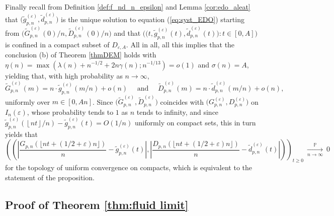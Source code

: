 \documentclass[a4, 11pt]{article}
\numberwithin{equation}{section}
\theoremstyle{plain}
\theoremstyle{definition}
\theoremstyle{remark}
\begin{document}
Finally recall from Definition \ref{def:f_nd_n_epsilon} and Lemma \ref{cor:edo_aleat} that $\big(\tilde{g}_{p,n}^{(\varepsilon)},\tilde{d}_{p,n}^{(\varepsilon)}\big)$ is the unique solution to equation (\ref{eq:syst_EDO}) starting from $\big(\tilde{G}^{(\varepsilon)}_{p,n}(0)/n,\tilde{D}^{(\varepsilon)}_{p,n}(0)/n\big)$ and that $\big(\big(t,\tilde{g}_{p,n}^{(\varepsilon)}(t),\tilde{d}_{p,n}^{(\varepsilon)}(t)\big):t\in \left[0,A\right]\big)$ is confined in a compact subset of $D_{\varepsilon,A}$. All in all, all this implies that the conclusion (b) of Theorem \ref{thmDEM} holds with $\eta(n)=\max(\lambda(n)+n^{-1/2}+2n\gamma(n);n^{-1/13})=o(1)$ and $\sigma(n)=A$, yielding that, with high probability as $n\to \infty$,
\begin{equation*}
	\tilde{G}^{(\varepsilon)}_{p,n}(m)=n\cdot \tilde{g}_{p,n}^{(\varepsilon)}(m/n)+o(n) \quad\text{ and }\quad  \tilde{D}^{(\varepsilon)}_{p,n}(m)=n\cdot \tilde{d}_{p,n}^{(\varepsilon)}(m/n)+o(n),
\end{equation*}
uniformly over $m\in [0,An]$. Since $\big(\tilde{G}^{(\varepsilon)}_{p,n},\tilde{D}^{(\varepsilon)}_{p,n}\big)$ coincides with $\big(G_{p,n}^{(\varepsilon)},D_{p,n}^{(\varepsilon)}\big)$ on $I_n(\varepsilon)$, whose probability tends to $1$ as $n$ tends to infinity, and since $\tilde{g}_{p,n}^{(\varepsilon)}\left(\left\lfloor nt\right\rfloor/n\right)-\tilde{g}_{p,n}^{(\varepsilon)}(t)=O\left(1/n\right)$ uniformly on compact sets, this in turn yields that
\begin{equation*}
		\left(\left(\left\lvert \frac{G_{p,n}\left(\lfloor nt+(1/2+\varepsilon) n\rfloor\right)}{n}-\tilde{g}_{p,n}^{(\varepsilon)}(t) \right\vert, \left\lvert \frac{D_{p,n}\left(\lfloor nt+(1/2+\varepsilon) n\rfloor\right)}{n}-\tilde{d}_{p,n}^{(\varepsilon)}(t) \right\vert \right)\right)_{t\geq 0}~\underset{n \rightarrow \infty }{\overset{\mathbb{P}}{\longrightarrow}}~0
\end{equation*}
for the topology of uniform convergence on compacts, which is equivalent to the statement of the proposition.

	\subsection{Proof of Theorem \ref{thm:fluid limit}}
	\label{sec:proofFL}		
\end{document}
